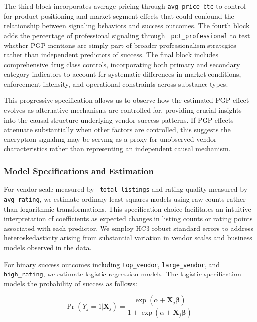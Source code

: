\documentclass{article}
\begin{document}
The third block incorporates average pricing through \texttt{avg_price_btc} to control for product positioning and market segment effects that could confound the relationship between signaling behaviors and success outcomes. The fourth block adds the percentage of professional signaling through \texttt{ pct_professional} to test whether PGP mentions are simply part of broader professionalism strategies rather than independent predictors of success. The final block includes comprehensive drug class controls, incorporating both primary and secondary category indicators to account for systematic differences in market conditions, enforcement intensity, and operational constraints across substance types.

This progressive specification allows us to observe how the estimated PGP effect evolves as alternative mechanisms are controlled for, providing crucial insights into the causal structure underlying vendor success patterns. If PGP effects attenuate substantially when other factors are controlled, this suggests the encryption signaling may be serving as a proxy for unobserved vendor characteristics rather than representing an independent causal mechanism.

\subsubsection{Model Specifications and Estimation}

For vendor scale measured by \texttt{ total_listings} and rating quality measured by \texttt{avg_rating}, we estimate ordinary least-squares models using raw counts rather than logarithmic transformations. This specification choice facilitates an intuitive interpretation of coefficients as expected changes in listing counts or rating points associated with each predictor. We employ HC3 robust standard errors to address heteroskedasticity arising from substantial variation in vendor scales and business models observed in the data.

For binary success outcomes including \texttt{top\_vendor}, \texttt{large\_vendor}, and \texttt{high\_rating}, we estimate logistic regression models. The logistic specification models the probability of success as follows:

\begin{equation}
\Pr(Y_j = 1|\mathbf{X}_j) = \frac{\exp(\alpha + \mathbf{X}_j\boldsymbol{\beta})}{1 + \exp(\alpha + \mathbf{X}_j\boldsymbol{\beta})}
\end{equation}
\end{document}
